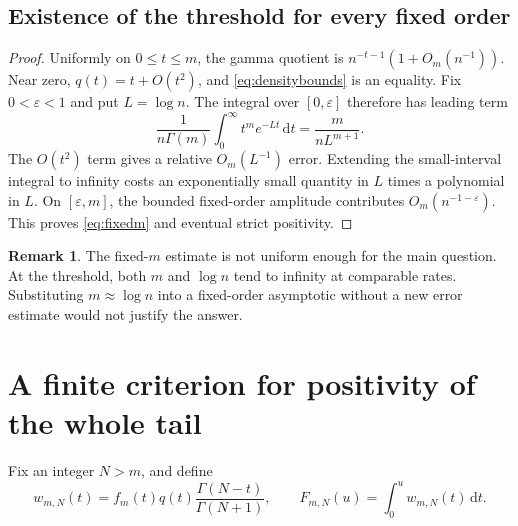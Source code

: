 \documentclass[11pt]{article}
\numberwithin{equation}{section}
\newtheorem{proposition}[theorem]{Proposition}
\theoremstyle{definition}
\newtheorem{remark}[theorem]{Remark}
\newcommand{\Gr}{\operatorname{Gr}}
\newcommand{\dd}{\,\mathrm dt}
\begin{document}
\subsection{Existence of the threshold for every fixed order}
\begin{proof}
Uniformly on $0\le t\le m$, the gamma quotient is
$n^{-t-1}(1+O_m(n^{-1}))$. Near zero, $q(t)=t+O(t^2)$, and
\eqref{eq:densitybounds} is an equality. Fix $0<\varepsilon<1$ and put
$L=\log n$. The integral over $[0,\varepsilon]$ therefore has leading term
\[
 \frac{1}{n\Gamma(m)}\int_0^\infty t^m e^{-Lt}\dd
 =\frac{m}{nL^{m+1}}.
\]
The $O(t^2)$ term gives a relative $O_m(L^{-1})$ error. Extending the
small-interval integral to infinity costs an exponentially small quantity
in $L$ times a polynomial in $L$. On $[\varepsilon,m]$, the bounded
fixed-order amplitude contributes $O_m(n^{-1-\varepsilon})$.
This proves \eqref{eq:fixedm} and eventual strict positivity.
\end{proof}

\begin{remark}
The fixed-$m$ estimate is not uniform enough for the main question.
At the threshold, both $m$ and $\log n$ tend to infinity at comparable
rates. Substituting $m\approx\log n$ into a fixed-order asymptotic
without a new error estimate would not justify the answer.
\end{remark}

\section{A finite criterion for positivity of the whole tail}\label{sec:propagation}

Fix an integer $N>m$, and define
\begin{equation}\label{eq:prefix}
 w_{m,N}(t)=f_m(t)q(t)\frac{\Gamma(N-t)}{\Gamma(N+1)},
 \qquad F_{m,N}(u)=\int_0^u w_{m,N}(t)\dd.
\end{equation}
\end{document}
